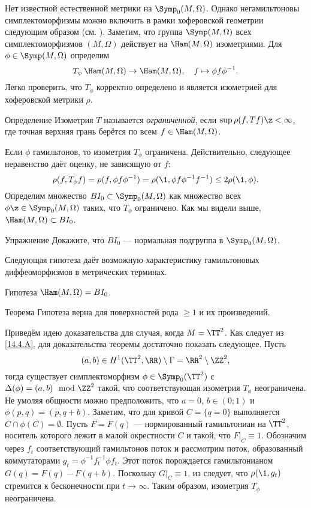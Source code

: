 Нет известной естественной метрики на $\Symp_0(M,\Omega)$.
Однако негамильтоновы симплектоморфизмы можно включить в рамки
хоферовской геометрии следующим образом (см. \cite{LP}). 
Заметим, что группа $\Symp(M,\Omega)$ всех симплектоморфизмов
$(M,\Omega)$ действует на $\Ham(M,\Omega)$ изометриями.
Для $\phi \in \Symp(M,\Omega)$ определим 
\[T_\phi\: \Ham(M,\Omega) \to \Ham(M,\Omega),
\quad
f \mapsto \phi f\phi^{-1}.\]
Легко проверить, что $T_\phi$ корректно определено и является
изометрией для хоферовской метрики $\rho$. 

\begin{ex*}{Определение}
Изометрия $T$ называется \emph{ограниченной}, если $\sup \rho(f, Tf)\z<\infty$, где
точная верхняя грань берётся по всем $f\in\Ham(M,\Omega)$. 
\end{ex*}


Если $\phi$ гамильтонов, то изометрия $T_\phi$ ограничена.
Действительно, следующее неравенство даёт оценку, не зависящую от $f$:
\[\rho(f,T_\phi f) = \rho(f,\phi f\phi^{-1}) = \rho(\1,\phi
f\phi^{-1}f^{-1})\le 2\rho(\1, \phi).\] 
Определим множество $BI_0 \subset \Symp_0(M,\Omega)$ как множество
всех $\phi \z\in \Symp_0(M,\Omega)$ таких, что $T_\phi$ ограничено. 
Как мы видели выше, $\Ham(M,\Omega)\subset BI_0$.

\begin{ex}{Упражнение}\label{14.4.A}
Докажите, что $BI_0$ — нормальная подгруппа в $\Symp_0(M,\Omega)$.
\end{ex}

Следующая гипотеза даёт возможную характеристику гамильтоновых
диффеоморфизмов в метрических терминах. 

\begin{ex*}{Гипотеза}
$\Ham(M,\Omega) = BI_0$.
\end{ex*}

\begin{thm}[(\cite{LP})]{Теорема}\label{14.4.B}
Гипотеза верна для поверхностей рода $\ge1$ и их произведений.
\end{thm}

Приведём идею доказательства для случая, когда $M=\TT^2$.
Как следует из \ref{14.4.A}, для доказательства теоремы достаточно
показать следующее.
Пусть
\[(a,b)\in H^1(\TT^2,\RR)\setminus\Gamma=\RR^2\setminus\ZZ^2,\]
тогда существует симплектоморфизм $\phi\in\Symp_0(\TT^2)$ с $\Delta
(\phi) = (a, b) \mod \ZZ^2$ такой, что соответствующая изометрия
$T_\phi$ неограничена. 
Не умоляя общности можно предположить, что $a= 0$, $b \in (0; 1)$ и $\phi(p, q) = (p, q + b)$.
Заметим, что для кривой $C = \{q = 0\}$ выполняется $C \cap \phi(C) = \emptyset$.
Пусть $F = F(q)$ — нормированный гамильтониан на $\TT^2$, носитель которого лежит в малой окрестности $C$ и такой, что $F|_C \equiv 1$.
Обозначим через $f_t$ соответствующий гамильтонов поток и рассмотрим поток, образованный коммутаторами $g_t = \phi^{-1}f_t^{-1}\phi f_t$.
Этот поток порождается гамильтонианом $G(q) = F(q) - F(q + b)$.
Поскольку $G|_C \equiv 1$, из  следует, что $\rho(\1, g_t)$
стремится к бесконечности при $t \to \infty$. 
Таким образом, изометрия $T_\phi$ неограничена.

